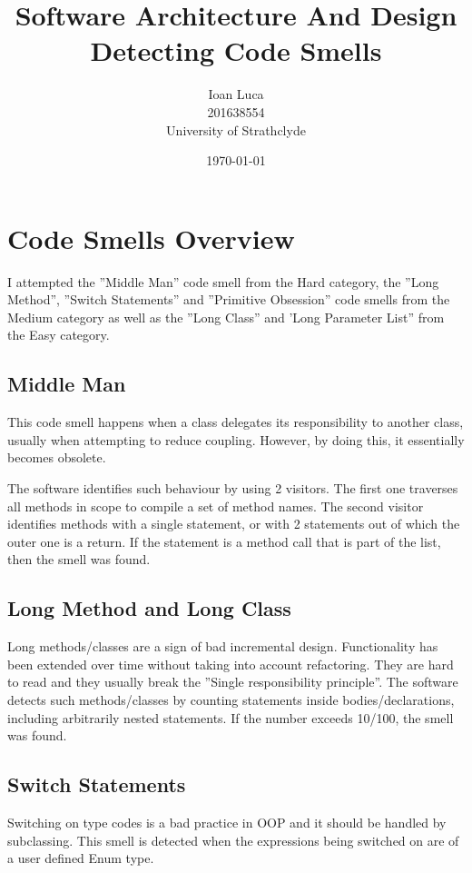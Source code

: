 \documentclass[a4paper]{article}
\begin{document}
\title{Software Architecture And Design \\ Detecting Code Smells}
\author{Ioan Luca \\ \small 201638554 \\ \small University of Strathclyde}
\date{\today}
\maketitle

\section{Code Smells Overview}
I attempted the ''Middle Man'' code smell from the Hard category,
the ''Long Method'', ''Switch Statements'' and ''Primitive Obsession'' code smells
from the Medium category as well as
the ''Long Class'' and 'Long Parameter List'' from the Easy category.

\subsection{Middle Man}
This code smell happens when a class delegates its responsibility to
another class, usually when attempting to reduce coupling. However, by
doing this, it essentially becomes obsolete.

The software identifies such behaviour by using 2 visitors.
The first one traverses all methods in scope to compile a set of
method names.
The second visitor identifies methods with a single statement, or with 2
statements
out of which the outer one is a return.
If the statement is a method call that is part of the list, then the smell was
found.

\subsection{Long Method and Long Class}
Long methods/classes are a sign of bad incremental design.
Functionality has been
extended over time without taking into account refactoring.
They are hard to read and they usually break the
''Single responsibility principle''.
The software detects such methods/classes by counting statements inside
bodies/declarations, including arbitrarily nested statements.
If the number exceeds 10/100, the smell was found.

\subsection{Switch Statements}
Switching on type codes is a bad practice in OOP and it should be handled by
subclassing.
This smell is detected when the expressions being switched on are of
a user defined Enum type.
\end{document}
